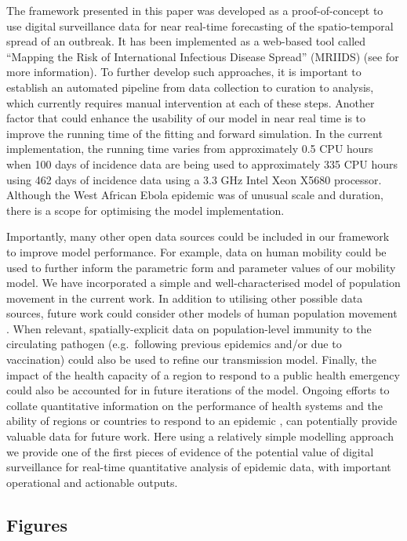 \documentclass[9pt,twocolumn,twoside,lineno]{pnas-new}
\begin{document}
The framework presented in this paper was developed as a
proof-of-concept to use digital surveillance data for near real-time
forecasting of the spatio-temporal spread of an outbreak. It has been
implemented as a web-based tool called ``Mapping the Risk of
International Infectious Disease Spread'' (MRIIDS) (see
\cite{mriidswiki} for more information). To further develop such
approaches, it is important to establish an automated pipeline from data
collection to curation to analysis, which currently requires manual
intervention at each of these steps. Another factor that could enhance
the usability of our model in near real time is to improve the running
time of the fitting and forward simulation. In the current
implementation, the running time varies from approximately 0.5 CPU hours when
100 days of incidence data are being used to approximately 335 CPU hours
using 462 days of incidence data using a 3.3 GHz Intel Xeon X5680
processor. Although the West African Ebola epidemic was of unusual scale
and duration, there is a scope for optimising the model implementation.

Importantly, many other open data sources could be included in our
framework to improve model performance. For example, data on human
mobility could be used to further inform the parametric form and
parameter values of our mobility model. We have incorporated
a simple and well-characterised model of population movement in the
current work. In
addition to utilising other possible data sources, future
work could consider other models of human population movement
\cite{simini2012universal}.
When relevant,
spatially-explicit data on population-level immunity to the circulating
pathogen (e.g.~following previous epidemics and/or due to vaccination)
could also be used to refine our transmission model. 
Finally, the impact of the health capacity of a region to respond to a
public health emergency could also be accounted for in future iterations of
the model. Ongoing efforts to collate 
quantitative information on the performance of health systems and the
ability of regions or countries to respond to an epidemic
\cite{healthsites}, \cite{maina2019spatial} can potentially provide
 valuable data for future work. 
Here using a relatively simple
modelling approach we provide one of the first pieces of evidence of the potential
value of digital surveillance for real-time quantitative analysis of
epidemic data, with important operational and actionable outputs.


\subsection*{Figures}\label{figures}
\end{document}
